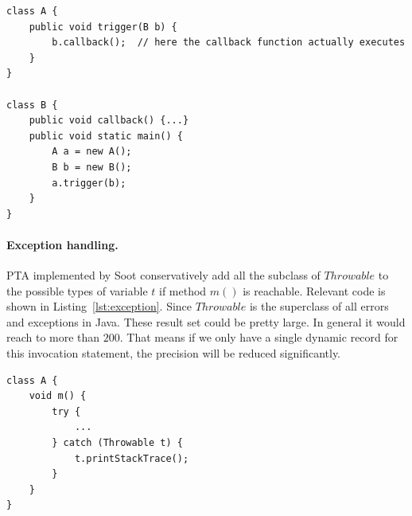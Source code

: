 \documentclass{fac}
\begin{document}
\begin{minipage}{\linewidth}
\vspace{10pt}
\begin{lstlisting}[caption={Callback mechanism},label={lst:callback}]
class A {
	public void trigger(B b) {
		b.callback();  // here the callback function actually executes
	}
}

class B {
	public void callback() {...}
	public void static main() {
		A a = new A();
		B b = new B();
		a.trigger(b);
 	}
}
\end{lstlisting}
\end{minipage}


\paragraph{Exception handling.} PTA implemented by Soot conservatively add all the subclass of $Throwable$ to the possible types of variable $t$ if method $m()$ is reachable. Relevant code is shown in Listing~\ref{lst:exception}. Since $Throwable$ is the superclass of all errors and exceptions in Java. These result set could be pretty large. In general it would reach to more than $200$. That means if we only have a single dynamic record for this invocation statement, the precision will be reduced significantly.

\begin{minipage}{\linewidth}
\vspace{10pt}
\begin{lstlisting}[caption={Java Exception},label={lst:exception}]
class A {
	void m() {
		try {
			...
		} catch (Throwable t) {
			t.printStackTrace();
		}
	}
}
\end{lstlisting}
\end{minipage}

\newcommand\commentout[1]{}
\end{document}
